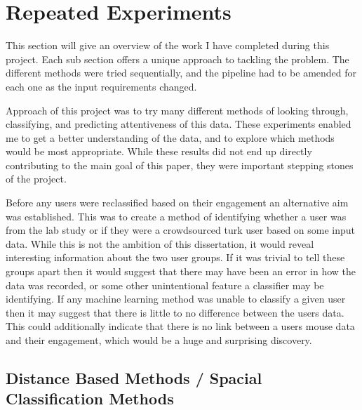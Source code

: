 \documentclass{article}
\begin{document}


\section{Repeated Experiments}

This section will give an overview of the work I have completed during this project.
Each sub section offers a unique approach to tackling the problem.
The different methods were tried sequentially, and the pipeline had to be amended for each one as the input requirements changed.

Approach of this project was to try many different methods of looking through, classifying, and predicting attentiveness of this data.
These experiments enabled me to get a better understanding of the data, and to explore which methods would be most appropriate.
While these results did not end up directly contributing to the main goal of this paper, they were important stepping stones of the project.

Before any users were reclassified based on their engagement an alternative aim was established.
This was to create a method of identifying whether a user was from the lab study or if they were a crowdsourced turk user based on some input data.
While this is not the ambition of this dissertation, it would reveal interesting information about the two user groups.
If it was trivial to tell these groups apart then it would suggest that there may have been an error in how the data was recorded, or some other unintentional feature a classifier may be identifying.
If any machine learning method was unable to classify a given user then it may suggest that there is little to no difference between the users data.
This could additionally indicate that there is no link between a users mouse data and their engagement, which would be a huge and surprising discovery. 


\subsection{Distance Based Methods / Spacial Classification Methods}
\end{document}
